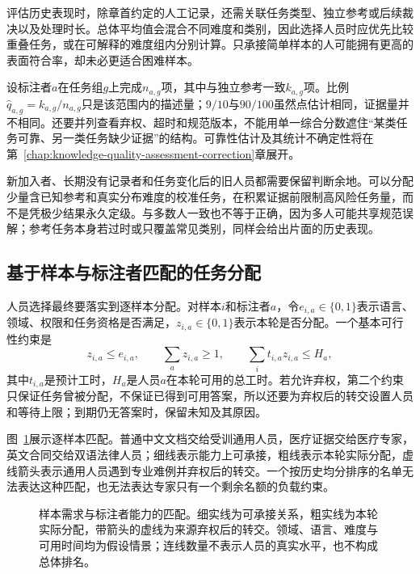 评估历史表现时，除章首约定的人工记录，还需关联任务类型、独立参考或后续裁决以及处理时长。总体平均值会混合不同难度和类别，因此选择人员时应优先比较重叠任务，或在可解释的难度组内分别计算。只承接简单样本的人可能拥有更高的表面符合率，却未必更适合困难样本。

设标注者$a$在任务组$g$上完成$n_{a,g}$项，其中与独立参考一致$k_{a,g}$项。比例$\widehat q_{a,g}=k_{a,g}/n_{a,g}$只是该范围内的描述量；$9/10$与$90/100$虽然点估计相同，证据量并不相同。还要并列查看弃权、超时和规范版本，不能用单一综合分数遮住“某类任务可靠、另一类任务缺少证据”的结构。可靠性估计及其统计不确定性将在第~\ref{chap:knowledge-quality-assessment-correction}章展开。

新加入者、长期没有记录者和任务变化后的旧人员都需要保留判断余地。可以分配少量含已知参考和真实分布难度的校准任务，在积累证据前限制高风险任务量，而不是凭极少结果永久定级。与多数人一致也不等于正确，因为多人可能共享规范误解；参考任务本身若过时或只覆盖常见类别，同样会给出片面的历史表现。

\subsection{基于样本与标注者匹配的任务分配}
\label{sec:knowledge-acquisition-human-matching}

人员选择最终要落实到逐样本分配。对样本$i$和标注者$a$，令$e_{i,a}\in\{0,1\}$表示语言、领域、权限和任务资格是否满足，$z_{i,a}\in\{0,1\}$表示本轮是否分配。一个基本可行性约束是
\begin{equation}
  z_{i,a}\leq e_{i,a},
  \qquad
  \sum_a z_{i,a}\geq1,
  \qquad
  \sum_i t_{i,a}z_{i,a}\leq H_a,
  \label{eq:knowledge-acquisition-human-assignment}
\end{equation}
其中$t_{i,a}$是预计工时，$H_a$是人员$a$在本轮可用的总工时。若允许弃权，第二个约束只保证任务曾被分配，不保证已得到可用答案，所以还要为弃权后的转交设置人员和等待上限；到期仍无答案时，保留未知及其原因。

图~\ref{fig:knowledge-acquisition-human-matching}展示逐样本匹配。普通中文文档交给受训通用人员，医疗证据交给医疗专家，英文合同交给双语法律人员；细线表示能力上可承接，粗线表示本轮实际分配，虚线箭头表示通用人员遇到专业难例并弃权后的转交。一个按历史均分排序的名单无法表达这种匹配，也无法表达专家只有一个剩余名额的负载约束。

\begin{figure}[htbp]
  \centering
  
  \caption{样本需求与标注者能力的匹配。细实线为可承接关系，粗实线为本轮实际分配，带箭头的虚线为来源弃权后的转交。领域、语言、难度与可用时间均为假设情景；连线数量不表示人员的真实水平，也不构成总体排名。}
  \label{fig:knowledge-acquisition-human-matching}
\end{figure}

